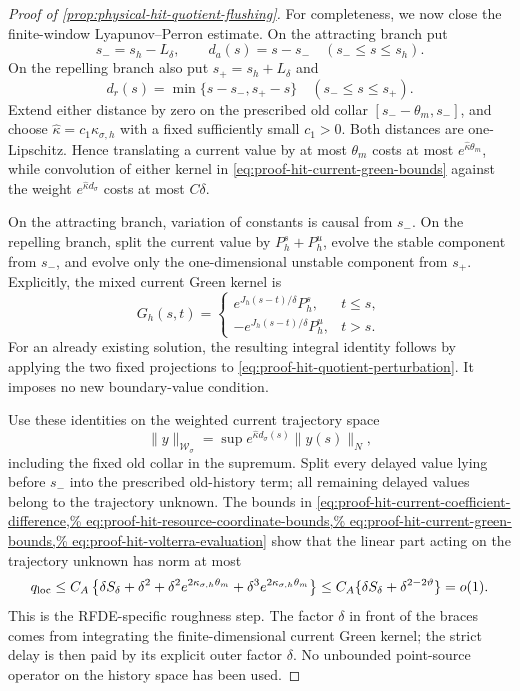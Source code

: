 \begin{proof}[Proof of
\cref{prop:physical-hit-quotient-flushing}]
For completeness, we now close the finite-window
Lyapunov--Perron estimate.  On the attracting branch put
\[
 s_-=s_h-L_\delta,\qquad d_a(s)=s-s_-
 \quad(s_-\le s\le s_h).
\]
On the repelling branch also put \(s_+=s_h+L_\delta\) and
\[
 d_r(s)=\min\{s-s_-,s_+-s\}
 \quad(s_-\le s\le s_+).
\]
Extend either distance by zero on the prescribed old collar
\([s_--\theta_m,s_-]\), and choose
\(\widehat\kappa=c_1\kappa_{\sigma,h}\) with a fixed sufficiently small
\(c_1>0\).  Both distances are one-Lipschitz.  Hence translating a current
value by at most \(\theta_m\) costs at most
\(e^{\widehat\kappa\theta_m}\), while convolution of either kernel in
\cref{eq:proof-hit-current-green-bounds} against the weight
\(e^{\widehat\kappa d_\sigma}\) costs at most \(C\delta\).

On the attracting branch, variation of constants is causal from \(s_-\).
On the repelling branch, split the current value by
\(P_h^s+P_h^u\), evolve the stable component from \(s_-\), and evolve
only the one-dimensional unstable component from \(s_+\).  Explicitly,
the mixed current Green kernel is
\begin{equation}
 G_h(s,t)=
 \begin{cases}
  e^{J_h(s-t)/\delta}P_h^s,&t\le s,\\
  -e^{J_h(s-t)/\delta}P_h^u,&t>s.
 \end{cases}                                      \label{eq:proof-hit-mixed-current-green}
\end{equation}
For an already existing solution, the resulting integral identity follows
by applying the two fixed projections to
\cref{eq:proof-hit-quotient-perturbation}.  It imposes no new
boundary-value condition.

Use these identities on the weighted current trajectory space
\[
 \|y\|_{\mathcal W_\sigma}
 =\sup e^{\widehat\kappa d_\sigma(s)}\|y(s)\|_N,
\]
including the fixed old collar in the supremum.  Split every delayed value
lying before \(s_-\) into the prescribed old-history term; all remaining
delayed values belong to the trajectory unknown.  The bounds in
\cref{eq:proof-hit-current-coefficient-difference,%
eq:proof-hit-resource-coordinate-bounds,%
eq:proof-hit-current-green-bounds,%
eq:proof-hit-volterra-evaluation}
show that the linear part acting on the trajectory unknown has norm at
most
\begin{equation}
 q_{\rm loc}
 \le C_A\left\{
    \delta S_\delta+\delta^2
       +\delta^2e^{2\kappa_{\sigma,h}\theta_m}
       +\delta^3e^{2\kappa_{\sigma,h}\theta_m}
          \right\}
 \le C_A\{\delta S_\delta+\delta^{2-2\vartheta}\}
 =o(1).                                           \label{eq:proof-hit-local-contraction}
\end{equation}
This is the RFDE-specific roughness step.  The factor \(\delta\) in front
of the braces comes from integrating the finite-dimensional current Green
kernel; the strict delay is then paid by its explicit outer factor
\(\delta\).  No unbounded point-source operator on the history space has
been used.


\end{proof}
